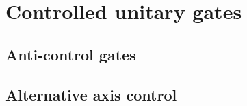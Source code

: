 

\newcommand*\halfcirc[1][0.5ex]{%
  \begin{tikzpicture}
  \draw[fill] (0,0)-- (90:#1) arc (90:-90:#1) -- cycle ;
  \draw (0,0) circle (#1);
  \end{tikzpicture}}

\newcommand*\fullcirc[1][0.4ex]{%
  \begin{tikzpicture}
  \draw[fill] (0,0) circle (#1);
  \end{tikzpicture}}

\newcommand*\emptycirc[1][0.5ex]{%
  \begin{tikzpicture}
  \draw (0,0) circle (#1);
  \end{tikzpicture}}


\clearpage

\section{Controlled unitary gates}



\subsection{Anti-control gates}

\subsection{Alternative axis control}




